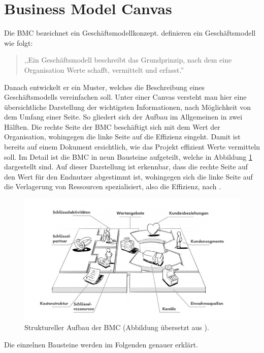 \section{Business Model Canvas}
\label{BMC_Kapitel}
Die \ac{BMC} bezeichnet ein Geschäftsmodellkonzept.  definieren ein Geschäftsmodell wie folgt:
\begin{quote}
,,Ein Geschäftsmodell beschreibt das Grundprinzip, nach dem eine Organisation Werte schafft, vermittelt und erfasst.''
\end{quote}
Danach entwickelt er ein Muster, welches die Beschreibung eines Geschäftsmodells vereinfachen soll. Unter einer Canvas versteht man hier eine übersichtliche Darstellung der wichtigsten Informationen, nach Möglichkeit von dem Umfang einer Seite. So gliedert sich der Aufbau im Allgemeinen in zwei Hälften. Die rechte Seite der \ac{BMC} beschäftigt sich mit dem Wert der Organisation, wohingegen die linke Seite auf die Effizienz eingeht. Damit ist bereits auf einem Dokument ersichtlich, wie das Projekt effizient Werte vermitteln soll. Im Detail ist die \ac{BMC} in neun Bausteine aufgeteilt, welche in Abbildung \ref{fig:BMC_Structure} dargestellt sind. Auf dieser Darstellung ist erkennbar, dass die rechte Seite auf den Wert für den Endnutzer abgestimmt ist, wohingegen sich die linke Seite auf die Verlagerung von Ressourcen spezialisiert, also die Effizienz, nach \citeauthor{BusinessModelGeneration}. 
\begin{figure}
	\begin{center}
		\includegraphics[scale=0.5]{99_IMG/02_Grundlagen/bmcStructure.jpg}
		\caption[Struktureller Aufbau der \ac{BMC}.]{Struktureller Aufbau der \ac{BMC} (Abbildung übersetzt aus ).}
		\label{fig:BMC_Structure}
	\end{center}
\end{figure}
Die einzelnen Bausteine werden im Folgenden genauer erklärt.

